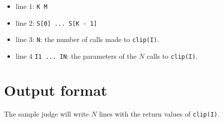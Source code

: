 \begin{itemize}
  \item line $1$: \texttt{K M}
  \item line $2$: \texttt{S[0] ... S[K - 1]}
  \item line $3$: \texttt{N}: the number of calls made to \texttt{clip(I)}.
  \item line $4$ \texttt{I1 ... IN}: the parameters of the $N$ calls to \texttt{clip(I)}.
\end{itemize}

\section*{Output format}
The sample judge will write $N$ lines with the return values of \texttt{clip(I)}.
